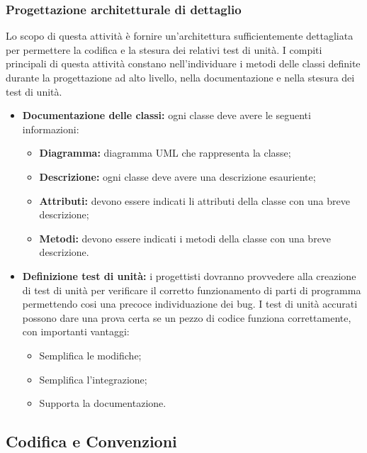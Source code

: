\subsubsection{Progettazione architetturale di dettaglio}
Lo scopo di questa attività è fornire un'architettura sufficientemente dettagliata per permettere la codifica e la stesura dei relativi test di unità. I compiti principali di questa attività constano nell'individuare i metodi delle classi definite durante la progettazione ad alto livello, nella documentazione e nella stesura dei test di unità.
	\begin{itemize}
		\item \textbf{Documentazione delle classi: }ogni classe deve avere le seguenti informazioni:
			\begin{itemize}
				\item \textbf{Diagramma: }diagramma UML che rappresenta la classe;
				\item \textbf{Descrizione: }ogni classe deve avere una descrizione esauriente;
				\item \textbf{Attributi: }devono essere indicati li attributi della classe con una breve descrizione;
				\item \textbf{Metodi: }devono essere indicati i metodi della classe con una breve descrizione.
			\end{itemize}
		\item \textbf{Definizione test di unità: } i progettisti dovranno provvedere alla creazione di test di unità per verificare il corretto funzionamento di parti di programma permettendo cosi una precoce individuazione dei bug. I test di unità accurati possono dare una prova certa se un pezzo di codice funziona correttamente, con importanti vantaggi:
			\begin{itemize}
				\item Semplifica le modifiche;
				\item Semplifica l'integrazione;
				\item Supporta la documentazione.
			\end{itemize}
	\end{itemize}

\subsection{Codifica e Convenzioni}



